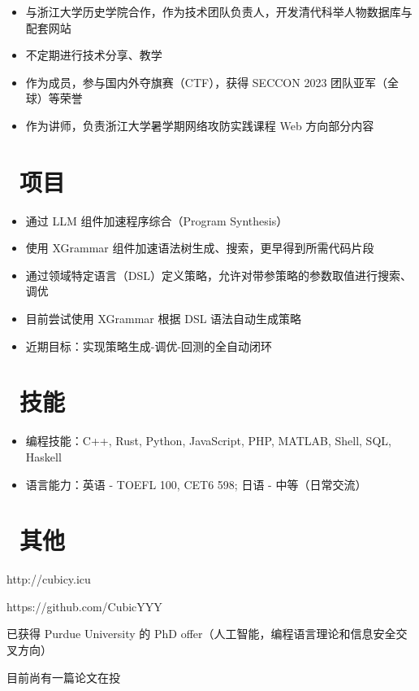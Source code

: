 \documentclass{resume}
\begin{document}
\begin{itemize}[parsep=0.5ex]
  \item 与浙江大学历史学院合作，作为技术团队负责人，开发清代科举人物数据库与配套网站
  \item 不定期进行技术分享、教学
\end{itemize}

\begin{itemize}[parsep=0.5ex]
  \item 作为成员，参与国内外夺旗赛（CTF），获得 SECCON 2023 团队亚军（全球）等荣誉
  \item 作为讲师，负责浙江大学暑学期网络攻防实践课程 Web 方向部分内容
\end{itemize}

\section{\faCogs\ 项目}

\begin{itemize}[parsep=0.5ex]
  \item 通过 LLM 组件加速程序综合（Program Synthesis）
  \item 使用 XGrammar 组件加速语法树生成、搜索，更早得到所需代码片段
\end{itemize}

\begin{itemize}[parsep=0.5ex]
  \item 通过领域特定语言（DSL）定义策略，允许对带参策略的参数取值进行搜索、调优
  \item 目前尝试使用 XGrammar 根据 DSL 语法自动生成策略
  \item 近期目标：实现策略生成-调优-回测的全自动闭环
\end{itemize}

\section{\faCogs\ 技能}
\begin{itemize}[parsep=0.5ex]
  \item 编程技能：C++, Rust, Python, JavaScript, PHP, MATLAB, Shell, SQL, Haskell
  \item 语言能力：英语 - TOEFL 100, CET6 598; 日语 - 中等（日常交流）
\end{itemize}

\section{\faInfo\ 其他}
\begin{description}[parsep=0.5ex]
  \item[个人博客] http://cubicy.icu
  \item[GitHub] https://github.com/CubicYYY
  \item[升学] 已获得 Purdue University 的 PhD offer（人工智能，编程语言理论和信息安全交叉方向）
  \item[论文] 目前尚有一篇论文在投
\end{description}
\end{document}

